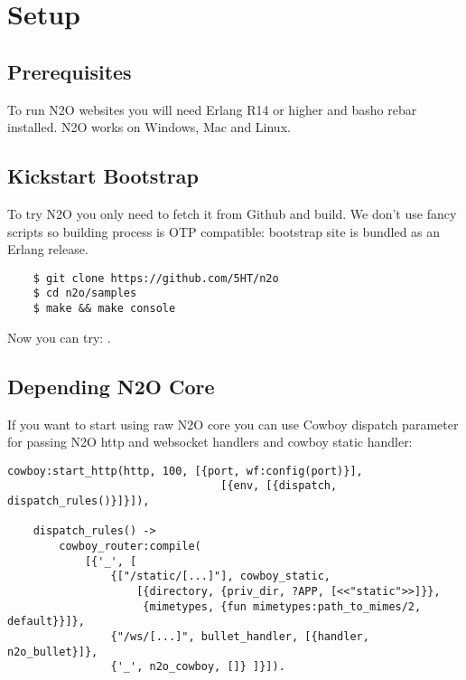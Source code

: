 \section{Setup}

\subsection{Prerequisites}
To run N2O websites you will need Erlang R14 or higher and basho rebar installed.
N2O works on Windows, Mac and Linux.

\subsection{Kickstart Bootstrap}
To try N2O you only need to fetch it from Github and build. We don't use
fancy scripts so building process is OTP compatible: bootstrap site
is bundled as an Erlang release.

\vspace{1\baselineskip}
\begin{lstlisting}
    $ git clone https://github.com/5HT/n2o
    $ cd n2o/samples
    $ make && make console
\end{lstlisting}
\vspace{1\baselineskip}

Now you can try: .

\newpage
\subsection{Depending N2O Core}
If you want to start using raw N2O core you can use Cowboy dispatch parameter
for passing N2O http and websocket handlers and cowboy static handler:

\begin{lstlisting}[caption=web\_sup.erl]
    cowboy:start_http(http, 100, [{port, wf:config(port)}],
                                 [{env, [{dispatch, dispatch_rules()}]}]),

    dispatch_rules() ->
        cowboy_router:compile(
            [{'_', [
                {["/static/[...]"], cowboy_static,
                    [{directory, {priv_dir, ?APP, [<<"static">>]}},
                     {mimetypes, {fun mimetypes:path_to_mimes/2, default}}]}, 
                {"/ws/[...]", bullet_handler, [{handler, n2o_bullet}]},
                {'_', n2o_cowboy, []} ]}]).
\end{lstlisting}

